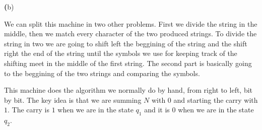 \documentclass[11pt]{article}
\newcommand{\question}[2] {\vspace{0.3in}\noindent{\subsection*{Question #1. #2} \vspace{0.15in}}}
\renewcommand{\part}[1] {{\vspace{0.15in}\noindent\textbf (#1)} \vspace{0.10in}}
\begin{document}
\part{b} \\
\par We can split this machine in two other problems. First we divide the string in the middle, then we match every character of the two produced strings. To divide the string in two we are going to shift left the beggining of the string and the shift right the end of the string until the symbols we use for keeping track of the shifting meet in the middle of the first string. The second part is basically going to the beggining of the two strings and comparing the symbols.
\begin{figure}[h]
\centering
{}
\end{figure}
\newpage

\question{4}{}
\par This machine does the algorithm we normally do by hand, from right to left, bit by bit. The key idea is that we are summing $N$ with $0$ and starting the carry with $1$. The carry is $1$ when we are in the state $q_1$ and it is $0$ when we are in the state $q_2$.
\begin{figure}[h]
\centering
{}
\end{figure}
\end{document}

